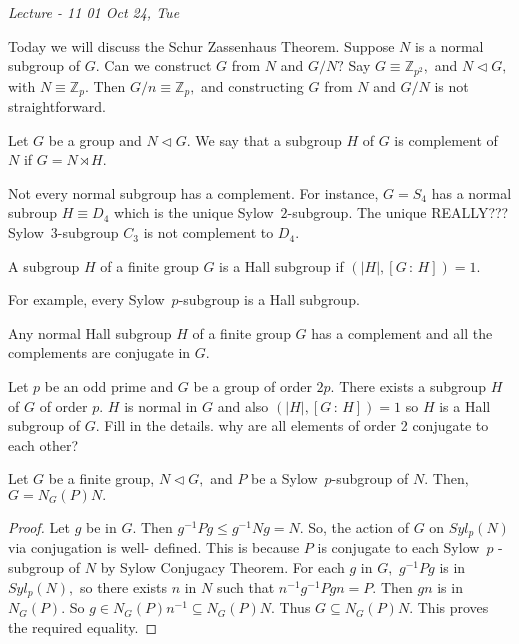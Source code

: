 
\noindent
\emph{Lecture - 11 \hfill 01 Oct 24, Tue}

Today we will discuss the Schur Zassenhaus Theorem.
Suppose $N$ is a normal subgroup of $G.$ Can we construct $G$
from $N$ and $G / N?$
Say $G \equiv \mathbb{Z}_{p^2},$ and $N \triangleleft G,$ with
$N \equiv \mathbb{Z}_{p}.$ Then $G / n \equiv \mathbb{Z}_{p},$
and constructing $G$ from $N$ and $G/N$ is not straightforward.
\begin{definition}[Complement]
	Let $G$ be a group and $N \triangleleft G.$ We say that
	a subgroup $H$ of $G$ is complement of $N$ if $G = N \rtimes H.$
\end{definition}

Not every normal subgroup has a complement. For instance,
$G = S_4$ has a normal subroup $H \equiv D_4$ which is the unique
Sylow~$2$\nobreakdash-subgroup. The unique REALLY???
Sylow~$3$\nobreakdash-subgroup $C_3$ is not complement to $D_4.$


\begin{definition}
	A subgroup $H$ of a finite group $G$ is a Hall subgroup if 
	$( \lvert H \rvert, [ G \, : \, H ] ) = 1.$
\end{definition}
For example, every Sylow~$p$\nobreakdash-subgroup is a Hall subgroup.

\begin{theorem}
	Any normal Hall subgroup $H$ of a finite group $G$ has a 
	complement and all the complements are conjugate in $G.$
\end{theorem}
\begin{example}
	Let $p$ be an odd prime and $G$ be a group of order $2p.$
	There exists a subgroup $H$ of $G$ of order $p.$ $H$ is
	normal in $G$ and also $( \lvert H \rvert, [G \, : \, H])
	= 1$ so $H$ is a Hall subgroup of $G.$ Fill in the details.
	why are all elements of order 2 conjugate to each other?
\end{example}

\begin{lemma}
	Let $G$ be a finite group, $N \triangleleft G,$ and $P$
	be a Sylow~$p$\nobreakdash-subgroup of $N.$ Then,
	$G = N_G(P) N.$
\end{lemma}
\begin{proof}
	Let $g$ be in $G.$ Then $ g^{-1} P g \leq g^{-1} N g = N.$
	So, the action of $G$ on $Syl_p(N)$ via conjugation is well-%
	defined. This is because $P$ is conjugate to each Sylow~$p$%
	\nobreakdash-subgroup of $N$ by Sylow Conjugacy Theorem.
	For each $g$ in $G,$ $g^{-1}Pg$ is in $Syl_p(N),$ so there
	exists $n$ in $N$ such that $n^{-1} g^{-1} P g n = P.$ Then $gn$ 
	is in $N_G(P).$ So $g \in N_G(P) n^{-1} \subseteq N_G(P) N.$
	Thus $G \subseteq N_G(P) N.$ This proves the required equality.
\end{proof}


